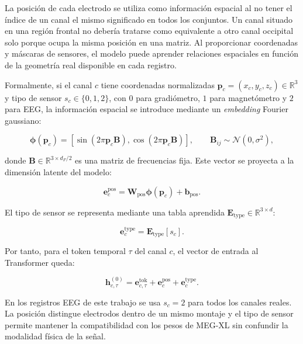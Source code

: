 La posición de cada electrodo se utiliza como información espacial al no tener el índice de un canal el mismo significado en todos los conjuntos. Un canal situado en una región frontal no debería tratarse como equivalente a otro canal occipital solo porque ocupa la misma posición en una matriz. Al proporcionar coordenadas y máscaras de sensores, el modelo puede aprender relaciones espaciales en función de la geometría real disponible en cada registro.

Formalmente, si el canal \(c\) tiene coordenadas normalizadas \(\mathbf{p}_c=(x_c,y_c,z_c)\in\mathbb{R}^3\) y tipo de sensor \(s_c\in\{0,1,2\}\), con \(0\) para gradiómetro, \(1\) para magnetómetro y \(2\) para EEG, la información espacial se introduce mediante un \textit{embedding} Fourier gaussiano:

\begin{equation}
\boldsymbol{\phi}(\mathbf{p}_c)=
\left[
\sin\left(2\pi \mathbf{p}_c \mathbf{B}\right),
\cos\left(2\pi \mathbf{p}_c \mathbf{B}\right)
\right],
\qquad
\mathbf{B}_{ij}\sim\mathcal{N}(0,\sigma^2),
\end{equation}

\noindent donde \(\mathbf{B}\in\mathbb{R}^{3\times d_F/2}\) es una matriz de frecuencias fija. Este vector se proyecta a la dimensión latente del modelo:

\begin{equation}
\mathbf{e}^{\text{pos}}_c =
\mathbf{W}_{\text{pos}}\boldsymbol{\phi}(\mathbf{p}_c)
+ \mathbf{b}_{\text{pos}}.
\end{equation}

El tipo de sensor se representa mediante una tabla aprendida \(\mathbf{E}_{\text{type}}\in\mathbb{R}^{3\times d}\):

\begin{equation}
\mathbf{e}^{\text{type}}_c =
\mathbf{E}_{\text{type}}[s_c].
\end{equation}

Por tanto, para el token temporal \(\tau\) del canal \(c\), el vector de entrada al Transformer queda:

\begin{equation}
\mathbf{h}^{(0)}_{c,\tau} =
\mathbf{e}^{\text{tok}}_{c,\tau}
+ \mathbf{e}^{\text{pos}}_c
+ \mathbf{e}^{\text{type}}_c.
\end{equation}

En los registros EEG de este trabajo se usa \(s_c=2\) para todos los canales reales. La posición distingue electrodos dentro de un mismo montaje y el tipo de sensor permite mantener la compatibilidad con los pesos de MEG-XL sin confundir la modalidad física de la señal.

